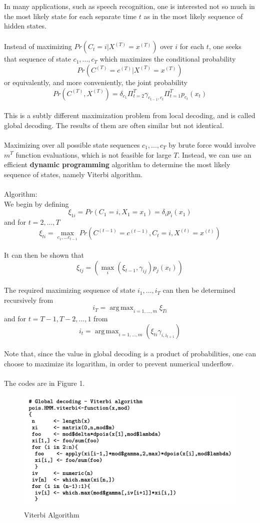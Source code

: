 \documentclass{article}
\DeclareMathOperator*{\argmax}{arg\,max}
\begin{document}
In many applications, such as speech recognition, one is interested not so much in the most likely state for each separate time $t$ as in the most likely sequence of hidden states. \\
\\
Instead of maximizing $Pr(C_t = i | X^{(T)} = x^{(T)})$ over $i$ for each $t$, one seeks that sequence of state $c_1, ..., c_T$ which maximizes the conditional probability 
$$Pr(C^{(T)} = c^{(T)} | X^{(T)} = x^{(T)})$$
or equivalently, and more conveniently, the joint probability
$$Pr(C^{(T)}, X^{(T)}) = \delta_{c_1} \Pi_{t=2}^T \gamma_{c_{t-1}, c_t} \Pi_{t=1}^T p_{c_t} (x_t)$$
\\
This is a subtly different maximization problem from local decoding, and is called global decoding. The results of them are often similar but not identical. \\
\\
Maximizing over all possible state sequences $c_1, ..., c_T$ by brute force would involve $m^T$ function evaluations, which is not feasible for large $T$. Instead, we can use an efficient \textbf{dynamic programming} algorithm to determine the most likely sequence of states, namely Viterbi algorithm. \\
\\
Algorithm: \\
We begin by defining
$$\xi_{1i} = Pr(C_1 = i, X_1 = x_1) = \delta_i p_i(x_1)$$
and for $t = 2, ..., T$
$$\xi_{ti} = \max_{c_1, ...c_{t-1}} Pr(C^{(t-1)} = c^{(t-1)}, C_t = i, X^{(t)} = x^{(t)})$$
\\
It can then be shown that 
$$\xi_{tj} = (\max_{i} (\xi_{t-1}, \gamma_{ij}) p_j(x_t))$$
\\
The required maximizing sequence of state $i_1, ..., i_T$ can then be determined recursively from 
$$i_T = \argmax_{i=1, ..., m} \xi_{Ti}$$
and for $t = T-1, T-2, ..., 1$ from 
$$i_t = \argmax_{i=1, ..., m} (\xi_{ti} \gamma_{i, i_{t+1}})$$
\\
Note that, since the value in global decoding is a product of probabilities, one can choose to maximize its logarithm, in order to prevent numerical underflow.  \\
\\
The codes are in Figure 1.
\begin{figure}
    \includegraphics[width = 12cm]{viterbi.png}
    \caption{Viterbi Algorithm}
\end{figure}
\end{document}
